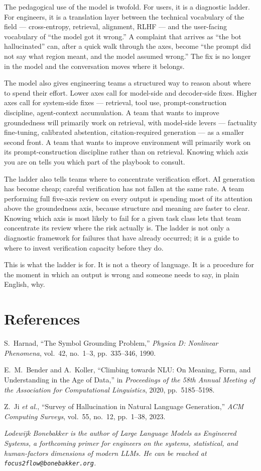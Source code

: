 \documentclass[11pt,a4paper]{article}
\begin{document}
The pedagogical use of the model is twofold. For users, it is a
diagnostic ladder. For engineers, it is a translation layer
between the technical vocabulary of the field --- cross-entropy,
retrieval, alignment, RLHF --- and the user-facing vocabulary of
``the model got it wrong.'' A complaint that arrives as ``the bot
hallucinated'' can, after a quick walk through the axes,
become ``the prompt did not say what region meant, and the model
assumed wrong.'' The fix is no longer in the model and the
conversation moves where it belongs.

The model also gives engineering teams a structured way to reason
about where to spend their effort. Lower axes call for model-side
and decoder-side fixes. Higher axes call for system-side fixes
--- retrieval, tool use, prompt-construction discipline,
agent-context accumulation. A team that wants to improve groundedness
will primarily work on retrieval, with model-side levers ---
factuality fine-tuning, calibrated abstention, citation-required
generation --- as a smaller second front. A team that wants to
improve environment will primarily work on its prompt-construction
discipline rather than on retrieval. Knowing which axis you are on tells
you which part of the playbook to consult.

The ladder also tells teams where to concentrate verification
effort. AI generation has become cheap; careful verification has
not fallen at the same rate. A team performing full five-axis
review on every output is spending most of its attention above
the groundedness axis, because structure and meaning are faster
to clear. Knowing which axis is most likely to fail for a given
task class lets that team concentrate its review where the risk
actually is. The ladder is not only a diagnostic framework for
failures that have already occurred; it is a guide to where to
invest verification capacity before they do.

This is what the ladder is for. It is not a theory of language.
It is a procedure for the moment in which an output is wrong and
someone needs to say, in plain English, why.

\section*{References}

\noindent
[1] S.~Harnad, ``The Symbol Grounding Problem,''
\emph{Physica D: Nonlinear Phenomena}, vol.~42, no.~1--3,
pp.~335--346, 1990.

\noindent
[2] E.~M.~Bender and A.~Koller, ``Climbing towards {NLU}: On
Meaning, Form, and Understanding in the Age of Data,'' in
\emph{Proceedings of the 58th Annual Meeting of the Association
for Computational Linguistics}, 2020, pp.~5185--5198.

\noindent
[3] Z.~Ji \emph{et al.}, ``Survey of Hallucination in Natural
Language Generation,'' \emph{ACM Computing Surveys}, vol.~55,
no.~12, pp.~1--38, 2023.

\bigskip

\noindent
\textit{Lodewijk Bonebakker is the author of \emph{Large Language
Models as Engineered Systems}, a forthcoming primer for engineers
on the systems, statistical, and human-factors dimensions of
modern LLMs. He can be reached at \texttt{focus2flow@bonebakker.org}.}
\end{document}
